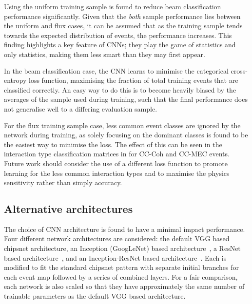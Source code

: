 Using the uniform training sample is found to reduce beam classification performance
significantly. Given that the \emph{both} sample performance lies between the uniform and flux
cases, it can be assumed that as the training sample tends towards the expected distribution of
events, the performance increases. This finding highlights a key feature of CNNs; they play the
game of statistics and only statistics, making them less smart than they may first appear.

In the beam classification case, the CNN learns to minimise the categorical cross-entropy loss
function, maximising the fraction of total training events that are classified correctly. An easy
way to do this is to become heavily biased by the averages of the sample used during training,
such that the final performance does not generalise well to a differing evaluation sample.

For the flux training sample case, less common event classes are ignored by the network during
training, as solely focusing on the dominant classes is found to be the easiest way to minimise
the loss. The effect of this can be seen in the interaction type classification matrices in
 for CC-Coh and CC-MEC events. Future work should consider the
use of a different loss function to promote learning for the less common interaction types and to
maximise the physics sensitivity rather than simply accuracy.

\subsection{Alternative architectures} %
\label{sec:results_alt_arch} %

The choice of CNN architecture is found to have a minimal impact performance. Four different
network architectures are considered: the default VGG based chipsnet architecture, an Inception
(GoogLeNet) based architecture~\cite{szegedy2015}, a ResNet based
architecture~\cite{he2016_improved}, and an Inception-ResNet based
architecture~\cite{szegedy2016}. Each is modified to fit the standard chipsnet pattern with
separate initial branches for each event map followed by a series of combined layers. For a fair
comparison, each network is also scaled so that they have approximately the same number of
trainable parameters as the default VGG based architecture.


